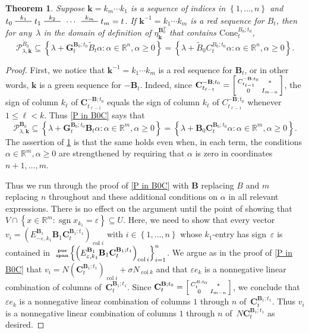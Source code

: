 \documentclass{amsart}
\newtheorem{theorem}[proposition]{Theorem}
\theoremstyle{definition}
\theoremstyle{remark}
\numberwithin{equation}{section}
\newcommand{\reals}{\mathbb R}
\newcommand{\edge}{\,\,\rule[2.7pt]{20pt}{0.5pt}\,\,}
\newcommand{\ep}{\varepsilon}
\newcommand{\col}{\operatorname{col}}
\newcommand{\sgn}{\operatorname{sgn}}
\newcommand{\posspan}{\!\tiny\begin{array}{c}\mathbf{pos}\\\mathbf{span}\end{array}\!\!}
\newcommand{\set}[1]{{\left\lbrace #1 \right\rbrace}}
\newcommand{\GG}{{\mathbf G}}
\newcommand{\CC}{{\mathbf C}}
\newcommand{\0}{{\mathbf{0}}}
\newcommand{\Cone}{\mathrm{Cone}}
\newcommand{\kk}{\mathbf{k}}
\newcommand{\tB}{{\tilde{B}}}
\newcommand{\BB}{\mathbf{B}}
\renewcommand{\P}{\mathcal{P}}
\begin{document}
\begin{theorem}\label{P in B0C extended}
Suppose $\kk=k_m\cdots k_1$ is a sequence of indices in $\set{1,\ldots, n}$ and $t_0\overset{k_1}{\edge}t_1\overset{k_2}{\edge}\,\cdots\,\overset{k_m}{\edge}t_m=t$.
If $\kk^{-1}=k_1\cdots k_m$ is a red sequence for $B_t$, then for any~$\lambda$ in the domain of definition of $\eta_\kk^{\BB_0^T}$ that contains $\Cone^{B_0;t_0}_t$,
\[\P^{\tB_0}_{\lambda,\kk}\subseteq\set{\lambda+\GG_t^{\BB_0;t_0}\tB_t\alpha:\alpha\in\reals^n,\alpha\ge0}=\set{\lambda+\tB_0C_t^{B_0;t_0}\alpha:\alpha\in\reals^n,\alpha\ge0}.\]
\end{theorem}
\begin{proof}
First, we notice that $\kk^{-1}=k_1\cdots k_m$ is a red sequence for $\BB_t$, or in other words, $\kk$ is a green sequence for $-\BB_t$.
Indeed, since $\CC_{t_{\ell-1}}^{-\BB;t_0}=\begin{bsmallmatrix}C_{t_{\ell-1}}^{-\BB;t_0}&*\\0&I_{m-n}\end{bsmallmatrix}$, the sign of column $k_\ell$ of $\CC_{t_{\ell-1}}^{-\BB;t_0}$ equals the sign of column $k_\ell$ of $C_{t_{\ell-1}}^{-\BB;t_0}$ whenever $1\le\ell<k$.
Thus \cref{P in B0C} says that
\[\P^{\BB_0}_{\lambda,\kk}\subseteq\set{\lambda+\GG_t^{\BB_0;t_0}\BB_t\alpha:\alpha\in\reals^m,\alpha\ge0}=\set{\lambda+\BB_0\CC_t^{\BB_0;t_0}\alpha:\alpha\in\reals^m,\alpha\ge0}.\]
The assertion of \cref{P in B0C extended} is that the same holds even when, in each term, the conditions $\alpha\in\reals^m,\alpha\ge0$ are strengthened by requiring that $\alpha$ is zero in coordinates $n+1,\ldots,m$.

Thus we run through the proof of \cref{P in B0C} with $\BB$ replacing $B$ and $m$ replacing $n$ throughout and these additional conditions on $\alpha$ in all relevant expressions.
There is no effect on the argument until the point of showing that $V\cap\set{x\in\reals^m:\sgn x_{k_1}=\ep}\subseteq U$.
Here, we need to show that every vector $v_i=\left(E^{\BB_1}_{-\ep,k_1}\BB_1\CC_t^{\BB_1;t_1}\right)_{\col i}$ with $i\in\set{1,\ldots,n}$ whose $k_1$-entry has sign~$\ep$ is contained in $\posspan\set{\left(E^{\BB_1}_{\ep,k_1}\BB_1\CC_t^{\BB_1;t_1}\right)_{\col i}}_{i=1}^n$.
We argue as in the proof of \cref{P in B0C} that $v_i=N\left(\CC_t^{\BB_1;t_1}\right)_{\col i}+\sigma N_{\col k}$ and that $\ep e_k$ is a nonnegative linear combination of columns of~$\CC_t^{\BB_1;t_1}$.
Since $\CC_t^{\BB;t_0}=\begin{bsmallmatrix}C_t^{B;t_0}&*\\0&I_{m-n}\end{bsmallmatrix}$, we conclude that $\ep e_k$ is a nonnegative linear combination of columns $1$ through $n$ of~$\CC_t^{\BB_1;t_1}$.
Thus $v_i$ is a nonnegative linear combination of columns $1$ through $n$ of~$N\CC_t^{\BB_1;t_1}$ as desired.
\end{proof}
\end{document}
